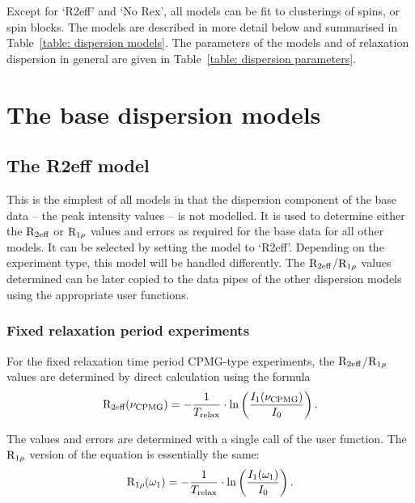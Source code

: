 Except for `R2eff' and `No Rex', all models can be fit to clusterings of spins, or spin blocks.
The models are described in more detail below and summarised in Table~\ref{table: dispersion models}.
The parameters of the models and of relaxation dispersion in general are given in Table~\ref{table: dispersion parameters}.






\section{The base dispersion models}
\label{sect: dispersion: base models}



\subsection{The R2eff model}
\label{sect: dispersion: R2eff model}

This is the simplest of all models in that the dispersion component of the base data -- the peak intensity values -- is not modelled.  It is used to determine either the $\mathrm{R}_\textrm{2eff}$ or $\mathrm{R}_{1\rho}$ values and errors as required for the base data for all other models.  It can be selected by setting the model to `R2eff'.  Depending on the experiment type, this model will be handled differently.  The $\mathrm{R}_\textrm{2eff}$/$\mathrm{R}_{1\rho}$ values determined can be later copied to the data pipes of the other dispersion models using the appropriate user functions.


\subsubsection{Fixed relaxation period experiments}

For the fixed relaxation time period CPMG-type experiments, the $\mathrm{R}_\textrm{2eff}$/$\mathrm{R}_{1\rho}$ values are determined by direct calculation using the formula
\begin{equation}
    \mathrm{R}_\textrm{2eff}(\nu_\textrm{CPMG}) = - \frac{1}{T_\textrm{relax}} \cdot \ln \left( \frac{I_1(\nu_\textrm{CPMG})}{I_0} \right) .
\end{equation}

The values and errors are determined with a single call of the  user function.  The $\mathrm{R}_{1\rho}$ version of the equation is essentially the same:
\begin{equation}
    \mathrm{R}_{1\rho}(\omega_1) = - \frac{1}{T_\textrm{relax}} \cdot \ln \left( \frac{I_1(\omega_1)}{I_0} \right) .
\end{equation}

